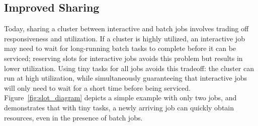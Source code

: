 \subsection{Improved Sharing}
Today, sharing a cluster between interactive and batch jobs involves trading off
responsiveness and utilization. If a cluster is highly utilized,
an interactive job may need to wait for long-running batch tasks to
complete before it can be serviced; reserving slots for
interactive jobs avoids this problem but results in lower utilization.
Using tiny tasks for all jobs avoids this tradeoff: the cluster can run at
high utilization, while
simultaneously guaranteeing that interactive jobs will only need to wait for
a short time before being serviced. Figure~\ref{fig:slot_diagram} depicts a simple example
with only two jobs, and demonstrates that with tiny tasks, a newly arriving
job can quickly obtain resources, even in the presence
of batch jobs.
